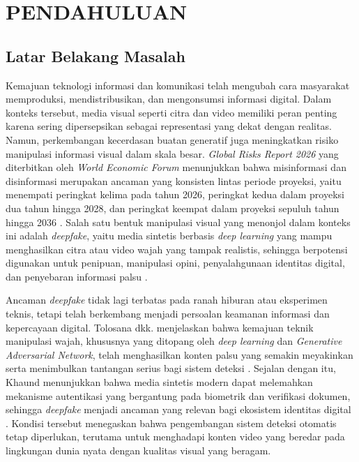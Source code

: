 \newpage
\chapter{PENDAHULUAN} \label{Bab I}

\section{Latar Belakang Masalah} \label{I.Latar Belakang}
Kemajuan teknologi informasi dan komunikasi telah mengubah cara masyarakat memproduksi, mendistribusikan, dan mengonsumsi informasi digital. Dalam konteks tersebut, media visual seperti citra dan video memiliki peran penting karena sering dipersepsikan sebagai representasi yang dekat dengan realitas. Namun, perkembangan kecerdasan buatan generatif juga meningkatkan risiko manipulasi informasi visual dalam skala besar. \textit{Global Risks Report 2026} yang diterbitkan oleh \textit{World Economic Forum} menunjukkan bahwa misinformasi dan disinformasi merupakan ancaman yang konsisten lintas periode proyeksi, yaitu menempati peringkat kelima pada tahun 2026, peringkat kedua dalam proyeksi dua tahun hingga 2028, dan peringkat keempat dalam proyeksi sepuluh tahun hingga 2036 \cite{WorldEconomicForumWEF2026}. Salah satu bentuk manipulasi visual yang menonjol dalam konteks ini adalah \textit{deepfake}, yaitu media sintetis berbasis \textit{deep learning} yang mampu menghasilkan citra atau video wajah yang tampak realistis, sehingga berpotensi digunakan untuk penipuan, manipulasi opini, penyalahgunaan identitas digital, dan penyebaran informasi palsu \cite{Tolosana2020,Mirsky_2021,BhaskardeepKhaund2025}. \par

Ancaman \textit{deepfake} tidak lagi terbatas pada ranah hiburan atau eksperimen teknis, tetapi telah berkembang menjadi persoalan keamanan informasi dan kepercayaan digital. Tolosana dkk. menjelaskan bahwa kemajuan teknik manipulasi wajah, khususnya yang ditopang oleh \textit{deep learning} dan \textit{Generative Adversarial Network}, telah menghasilkan konten palsu yang semakin meyakinkan serta menimbulkan tantangan serius bagi sistem deteksi \cite{Tolosana2020}. Sejalan dengan itu, Khaund menunjukkan bahwa media sintetis modern dapat melemahkan mekanisme autentikasi yang bergantung pada biometrik dan verifikasi dokumen, sehingga \textit{deepfake} menjadi ancaman yang relevan bagi ekosistem identitas digital \cite{BhaskardeepKhaund2025}. Kondisi tersebut menegaskan bahwa pengembangan sistem deteksi otomatis tetap diperlukan, terutama untuk menghadapi konten video yang beredar pada lingkungan dunia nyata dengan kualitas visual yang beragam. \par

